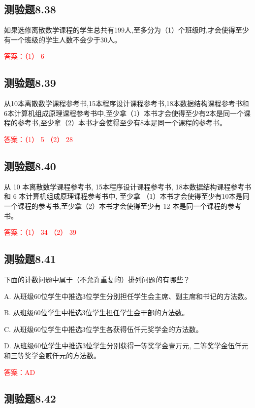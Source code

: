 \documentclass[UTF8, heading=true]{ctexart}
\begin{document}
\subsection{测验题8.38}

如果选修离散数学课程的学生总共有199人,至多分为（1）个班级时,才会使得至少有一个班级的学生人数不会少于30人。

\textcolor{red}{答案：（1） 6}


\subsection{测验题8.39}

从10本离散数学课程参考书,15本程序设计课程参考书,18本数据结构课程参考书和6本计算机组成原理课程参考书中,至少拿（1）本书才会使得至少有2本是同一个课程的参考书,至少拿（2）本书才会使得至少有8本是同一个课程的参考书。

\textcolor{red}{答案：（1） 5 （2） 28}

\subsection{测验题8.40}

从 10 本离散数学课程参考书, 15本程序设计课程参考书, 18本数据结构课程参考书和 6 本计算机组成原理课程参考书中, 至少拿
（1）本书才会使得至少有10本是同一个课程的参考书,至少拿（2）本书才会使得至少有 12 本是同一个课程的参考书。

\textcolor{red}{答案：（1） 34 （2） 39}

\subsection{测验题8.41}

下面的计数问题中属于（不允许重复的）排列问题的有哪些？

A. 从班级60位学生中推选3位学生分别担任学生会主席、副主席和书记的方法数。

B. 从班级60位学生中推选3位学生担任学生会干部的方法数。

C. 从班级60位学生中推选3位学生各获得伍仟元奖学金的方法数。

D. 从班级60位学生中推选3位学生分别获得一等奖学金壹万元, 二等奖学金伍仟元和三等奖学金贰仟元的方法数。

\textcolor{red}{答案：AD}

\subsection{测验题8.42}
\end{document}
